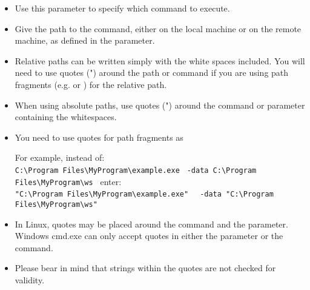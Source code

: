 
\begin{itemize}
\item Use this parameter to specify which command to execute.
\item Give the path to the command, either on the local machine or on the remote machine, as defined in the  parameter. 
\item Relative paths can be written simply with the white spaces included. You will need to use quotes (") around the path or command if you are using path fragments (e.g.  or ) for the relative path.  
\item When using absolute paths, use quotes (") around the command or parameter containing the whitespaces. 
\item You need to use quotes for path fragments as 

For example, instead of: \\
\verb+C:\Program Files\MyProgram\example.exe +
\newline
\verb+-data C:\Program Files\MyProgram\ws +
\newline
enter:\\
\verb+"C:\Program Files\MyProgram\example.exe" +
\newline
\verb+ -data "C:\Program Files\MyProgram\ws" +

\item In Linux, quotes may be placed around the command and the parameter. Windows cmd.exe can only accept quotes in either the parameter or the command. 
\item Please bear in mind that strings within the quotes are not checked for validity. 

\end{itemize}

